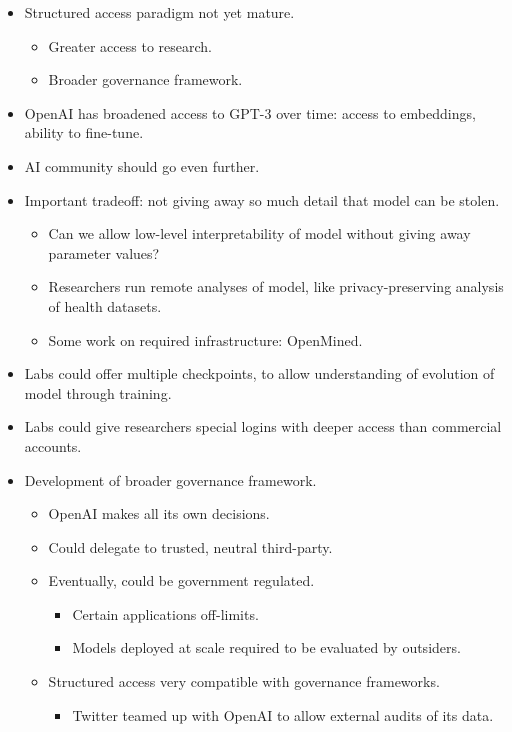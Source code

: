 \begin{itemize}
    \item Structured access paradigm not yet mature.
    \begin{itemize}
        \item Greater access to research.
        \item Broader governance framework.
    \end{itemize}
    \item OpenAI has broadened access to GPT-3 over time: access to embeddings, ability to fine-tune.
    \item AI community should go even further.
    \item Important tradeoff: not giving away so much detail that model can be stolen.
    \begin{itemize}
        \item Can we allow low-level interpretability of model without giving away parameter values?
        \item Researchers run remote analyses of model, like privacy-preserving analysis of health datasets.
        \item Some work on required infrastructure: OpenMined.
    \end{itemize}
    \item Labs could offer multiple checkpoints, to allow understanding of evolution of model through training.
    \item Labs could give researchers special logins with deeper access than commercial accounts.
    \item Development of broader governance framework.
    \begin{itemize}
        \item OpenAI makes all its own decisions.
        \item Could delegate to trusted, neutral third-party.
        \item Eventually, could be government regulated.
        \begin{itemize}
            \item Certain applications off-limits.
            \item Models deployed at scale required to be evaluated by outsiders.
        \end{itemize}
        \item Structured access very compatible with governance frameworks.
        \begin{itemize}
            \item Twitter teamed up with OpenAI to allow external audits of its data.
        \end{itemize}
    \end{itemize}
\end{itemize}


